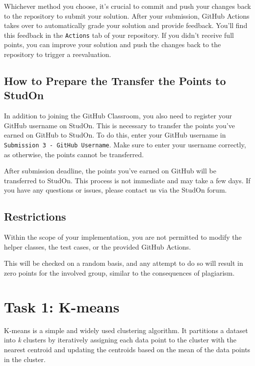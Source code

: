 \documentclass[
english,
smallborders
]{i6prcsht}
\begin{document}
Whichever method you choose, it's crucial to commit and push your changes back to the repository to submit your solution\footnotemark[\value{footnote}]. After your submission, GitHub Actions takes over to automatically grade your solution and provide feedback. You'll find this feedback in the \texttt{Actions} tab of your repository. If you didn't receive full points, you can improve your solution and push the changes back to the repository to trigger a reevaluation.

\subsection*{How to Prepare the Transfer the Points to StudOn}

In addition to joining the GitHub Classroom, you also need to register your GitHub username on StudOn. This is necessary to transfer the points you've earned on GitHub to StudOn. To do this, enter your GitHub username in \texttt{Submission 3 - GitHub Username}. Make sure to enter your username correctly, as otherwise, the points cannot be transferred.

After submission deadline, the points you've earned on GitHub will be transferred to StudOn. This process is not immediate and may take a few days. If you have any questions or issues, please contact us via the StudOn forum.

\subsection*{Restrictions}

Within the scope of your implementation, you are not permitted to modify the helper classes, the test cases, or the provided GitHub Actions.

This will be checked on a random basis, and any attempt to do so will result in zero points for the involved group, similar to the consequences of plagiarism.

\newpage

\section*{Task 1: K-means}
\label{sec:task-one}

K-means is a simple and widely used clustering algorithm. It partitions a dataset into \textit{k} clusters by iteratively assigning each data point to the cluster with the nearest centroid and updating the centroids based on the mean of the data points in the cluster.
\end{document}
